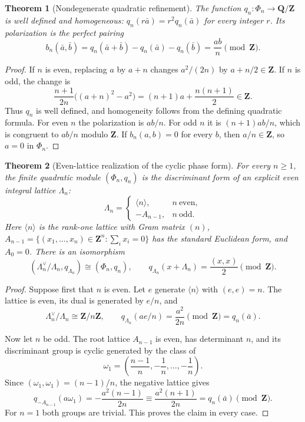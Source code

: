 \documentclass[11pt]{amsart}
\numberwithin{equation}{section}
\newtheorem{theorem}{Theorem}[section]
\theoremstyle{definition}
\newcommand{\Z}{\mathbf Z}
\newcommand{\Q}{\mathbf Q}
\begin{document}
\begin{theorem}[Nondegenerate quadratic refinement]
\label{thm:cyclic-quadratic-refinement}
The function $q_n:\Phi_n\to\Q/\Z$ is well defined and homogeneous:
$q_n(r\bar a)=r^2q_n(\bar a)$ for every integer $r$.  Its polarization is
the perfect pairing
\[
b_n(\bar a,\bar b)
=q_n(\bar a+\bar b)-q_n(\bar a)-q_n(\bar b)
=\frac{ab}{n}\pmod\Z.
\]
\end{theorem}

\begin{proof}
If $n$ is even, replacing $a$ by $a+n$ changes $a^2/(2n)$ by
$a+n/2\in\Z$.  If $n$ is odd, the change is
\[
\frac{n+1}{2n}\bigl((a+n)^2-a^2\bigr)
=(n+1)a+\frac{n(n+1)}2\in\Z.
\]
Thus $q_n$ is well defined, and homogeneity follows from the defining
quadratic formula.  For even $n$ the polarization is $ab/n$.  For odd
$n$ it is $(n+1)ab/n$, which is congruent to $ab/n$ modulo $\Z$.  If
$b_n(a,b)=0$ for every $b$, then $a/n\in\Z$, so $a=0$ in $\Phi_n$.
\end{proof}

\begin{theorem}[Even-lattice realization of the cyclic phase form]
\label{thm:cyclic-discriminant-lattice}
For every $n\geq1$, the finite quadratic module $(\Phi_n,q_n)$ is the
discriminant form of an explicit even integral lattice $\Lambda_n$:
\[
\Lambda_n=
\begin{cases}
\langle n\rangle,& n\ \text{even},\\
-A_{n-1},& n\ \text{odd}.
\end{cases}
\]
Here $\langle n\rangle$ is the rank-one lattice with Gram matrix $(n)$,
$A_{n-1}=\{(x_1,\dots,x_n)\in\Z^n:\sum_i x_i=0\}$ has the standard
Euclidean form, and $A_0=0$.  There is an isomorphism
\[
(\Lambda_n^\vee/\Lambda_n,q_{\Lambda_n})
\cong(\Phi_n,q_n),
\qquad
q_{\Lambda_n}(x+\Lambda_n)=\frac{(x,x)}2\pmod\Z.
\]
\end{theorem}

\begin{proof}
Suppose first that $n$ is even.  Let $e$ generate $\langle n\rangle$ with
$(e,e)=n$.  The lattice is even, its dual is generated by $e/n$, and
\[
\Lambda_n^\vee/\Lambda_n\cong\Z/n\Z,
\qquad
q_{\Lambda_n}(a e/n)=\frac{a^2}{2n}\pmod\Z=q_n(\bar a).
\]

Now let $n$ be odd.  The root lattice $A_{n-1}$ is even, has determinant
$n$, and its discriminant group is cyclic generated by the class of
\[
\omega_1=
\left(\frac{n-1}{n},-\frac1n,\dots,-\frac1n\right).
\]
Since $(\omega_1,\omega_1)=(n-1)/n$, the negative lattice gives
\[
q_{-A_{n-1}}(a\omega_1)
=-\frac{a^2(n-1)}{2n}
\equiv\frac{a^2(n+1)}{2n}
=q_n(\bar a)\pmod\Z.
\]
For $n=1$ both groups are trivial.  This proves the claim in every case.
\end{proof}
\end{document}
